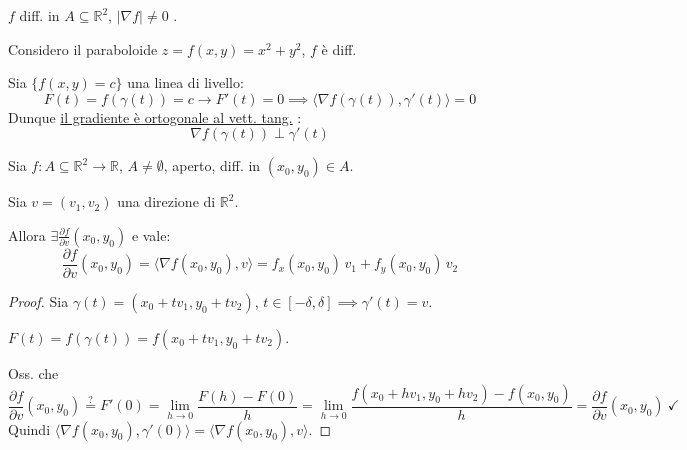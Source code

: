 $f$ diff. in $A \subseteq \mathbb{R}^2$, $\vert \nabla f \vert \neq 0$ .

Considero il paraboloide $z = f(x, y) = x^2 + y^2$, $f$ è diff.

\begin{center}
\end{center}

Sia $\{ f(x, y) = c \}$ una linea di livello:
\[
F(t) = f(\gamma(t)) = c \to F'(t) = 0 \implies \langle \nabla f(\gamma(t)), \gamma'(t) \rangle = 0
\]
Dunque \underline{il gradiente è ortogonale al vett. tang.} :
\[
\nabla f(\gamma(t)) \perp \gamma'(t)
\]

\begin{theorem}
Sia $f : A \subseteq \mathbb{R}^2 \to \mathbb{R}$, $A \neq \emptyset$, aperto, diff. in $(x_0, y_0) \in A$.

Sia $v = (v_1, v_2)$ una direzione di $\mathbb{R}^2$.

Allora $\exists \frac{\partial f}{\partial v}(x_0, y_0)$ e vale:
\[
\boxed{\frac{\partial f}{\partial v}(x_0, y_0) = \langle \nabla f(x_0, y_0), v \rangle = f_x(x_0, y_0)\, v_1 + f_y(x_0, y_0)\, v_2}
\]
\end{theorem}

\begin{proof}
Sia $\gamma(t) = (x_0 + t v_1, y_0 + t v_2)$, $t \in [-\delta, \delta] \implies \gamma'(t) = v$.

$F(t) = f(\gamma(t)) = f(x_0 + t v_1, y_0 + t v_2)$.

Oss. che
\[
\frac{\partial f}{\partial v}(x_0, y_0) \stackrel{?}{=} F'(0) = \lim_{h \to 0} \frac{F(h) - F(0)}{h} = \lim_{h \to 0} \frac{f(x_0 + h v_1, y_0 + h v_2) - f(x_0, y_0)}{h} = \frac{\partial f}{\partial v}(x_0, y_0) \ \checkmark
\]
Quindi $\langle \nabla f(x_0, y_0), \gamma'(0) \rangle = \langle \nabla f(x_0, y_0), v \rangle$.
\end{proof}

